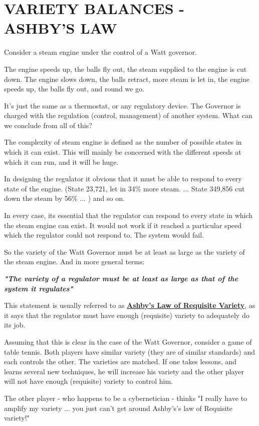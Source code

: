 \section*{VARIETY BALANCES - ASHBY'S LAW}
Consider a steam engine under the control of a Watt governor.

The engine speeds up, the balls fly out, the steam supplied to the engine is cut down. The engine slows down, the balls retract, more steam is let in, the engine speeds up, the balls fly out, and round we go.

It's just the same as a thermostat, or any regulatory device. The Governor is charged with the regulation (control, management) of another system. What can we conclude from all of this?

The complexity of steam engine is defined as the number of possible states in which it can exist. This will mainly be concerned with the different speeds at which it can run, and it will be huge.

In designing the regulator it obvious that it must be able to respond to every state of the engine. (State 23,721, let in 34\% more steam. ... State 349,856 cut down the steam by 56\% ... ) and so on.

In every case, its essential that the regulator can respond to every state in which the steam engine can exist. It would not work if it reached a particular speed which the regulator could not respond to. The system would fail.

So the variety of the Watt Governor must be at least as large as the variety of the steam engine. And in more general terms:

\textbf{\textit{"The variety of a regulator must be at least as large as that of the system it regulates"}}

This statement is usually referred to as \textbf{\href{https://vsmg.lrc.org.uk/screen.php?page=bibliography}{Ashby's Law of Requisite Variety}}, as it says that the regulator must have enough (requisite) variety to adequately do its job.

Assuming that this is clear in the case of the Watt Governor, consider a game of table tennis. Both players have similar variety (they are of similar standards) and each controls the other. The varieties are matched. If one takes lessons, and learns several new techniques, he will increase his variety and the other player will not have enough (requisite) variety to control him.

The other player - who happens to be a cybernetician - thinks "I really have to amplify my variety ... you just can't get around Ashby's's law of Requisite variety!"

